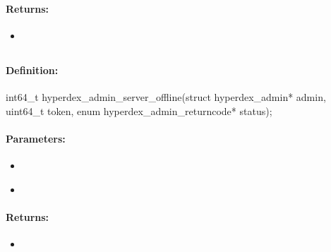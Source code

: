 \paragraph{Returns:}
\begin{itemize}[noitemsep]
\item {}\\

\end{itemize}

\pagebreak
\subsection{}
\label{api:c:server_offline}


\paragraph{Definition:}
\begin{ccode}
int64_t hyperdex_admin_server_offline(struct hyperdex_admin* admin,
        uint64_t token,
        enum hyperdex_admin_returncode* status);
\end{ccode}

\paragraph{Parameters:}
\begin{itemize}[noitemsep]
\item {}\\

\item {}\\

\end{itemize}

\paragraph{Returns:}
\begin{itemize}[noitemsep]
\item {}\\

\end{itemize}

